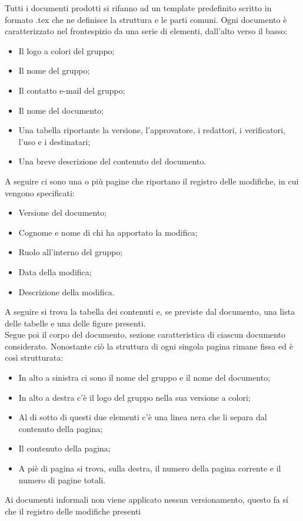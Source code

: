 Tutti i documenti prodotti si rifanno ad un template predefinito scritto in formato .tex che ne definisce la struttura 
e le parti comuni. Ogni documento è caratterizzato nel frontespizio da una serie di elementi, dall'alto verso il basso:
\begin{itemize}
    \item Il logo a colori del gruppo;
    \item Il nome del gruppo;
    \item Il contatto e-mail del gruppo;
    \item Il nome del documento;
    \item Una tabella riportante la versione, l'approvatore, i redattori, i verificatori, l'uso e i destinatari;
    \item Una breve descrizione del contenuto del documento.
\end{itemize}
A seguire ci sono una o più pagine che riportano il registro delle modifiche, in cui vengono specificati:
\begin{itemize}
    \item Versione del documento;
    \item Cognome e nome di chi ha apportato la modifica;
    \item Ruolo all'interno del gruppo;
    \item Data della modifica;
    \item Descrizione della modifica.
\end{itemize}
A seguire si trova la tabella dei contenuti e, se previste dal documento, una lista delle tabelle e una delle figure presenti.\\
Segue poi il corpo del documento, sezione caratteristica di ciascun documento considerato. Nonostante ciò la struttura 
di ogni singola pagina rimane fissa ed è così strutturata:
\begin{itemize}
    \item In alto a sinistra ci sono il nome del gruppo e il nome del documento;
    \item In alto a destra c'è il logo del gruppo nella sua versione a colori;
    \item Al di sotto di questi due elementi c'è una linea nera che li separa dal contenuto della pagina;
    \item Il contenuto della pagina;
    \item A piè di pagina si trova, sulla destra, il numero della pagina corrente e il numero di pagine totali.
\end{itemize}
Ai documenti informali non viene applicato nessun versionamento, questo fa sí che il registro delle modifiche presenti 
